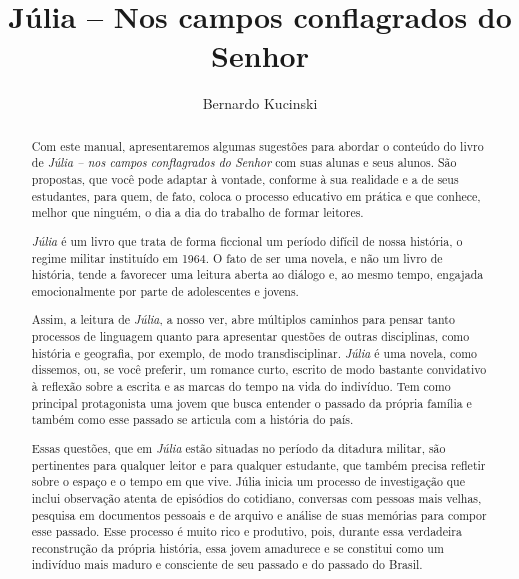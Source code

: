 \documentclass[12pt]{extarticle}
\begin{document}
\newcommand{\AutorLivro}{Bernardo Kucinski}
\newcommand{\TituloLivro}{Júlia – Nos campos conflagrados do Senhor}
\newcommand{\Tema}{Ficção, mistério e fantasia}
\newcommand{\Genero}{Romance}
\newcommand{\imagemCapa}{./images/PNLD0053-01.png}
\newcommand{\issnppub}{---}
\newcommand{\issnepub}{---}
\newcommand{\colaborador}{{Haroldo Ceravolo}}


\title{\TituloLivro}
\author{\AutorLivro}
\def\authornotes{\colaborador}

\date{}
\maketitle





\begin{abstract}

Com este manual, apresentaremos algumas sugestões para abordar o
conteúdo do livro de \emph{Júlia -- nos campos conflagrados do Senhor}
com suas alunas e seus alunos. São propostas, que você pode adaptar à
vontade, conforme à sua realidade e a de seus estudantes, para quem, de
fato, coloca o processo educativo em prática e que conhece, melhor que
ninguém, o dia a dia do trabalho de formar leitores.

\emph{Júlia} é um livro que trata de forma ficcional um período difícil
de nossa história, o regime militar instituído em 1964. O fato de ser
uma novela, e não um livro de história, tende a favorecer uma leitura
aberta ao diálogo e, ao mesmo tempo, engajada emocionalmente por parte
de adolescentes e jovens.

Assim, a leitura de \emph{Júlia}, a nosso ver, abre múltiplos caminhos
para pensar tanto processos de linguagem quanto para apresentar questões
de outras disciplinas, como história e geografia, por exemplo, de modo
transdisciplinar. \emph{Júlia} é uma novela, como dissemos, ou, se você
preferir, um romance curto, escrito de modo bastante convidativo à
reflexão sobre a escrita e as marcas do tempo na vida do indivíduo. Tem
como principal protagonista uma jovem que busca entender o passado da
própria família e também como esse passado se articula com a história do
país.

Essas questões, que em \emph{Júlia} estão situadas no período da
ditadura militar, são pertinentes para qualquer leitor e para qualquer
estudante, que também precisa refletir sobre o espaço e o tempo em que
vive. Júlia inicia um processo de investigação que inclui observação
atenta de episódios do cotidiano, conversas com pessoas mais velhas,
pesquisa em documentos pessoais e de arquivo e análise de suas memórias
para compor esse passado. Esse processo é muito rico e produtivo, pois,
durante essa verdadeira reconstrução da própria história, essa jovem
amadurece e se constitui como um indivíduo mais maduro e consciente de
seu passado e do passado do Brasil.


\end{abstract}
\end{document}
